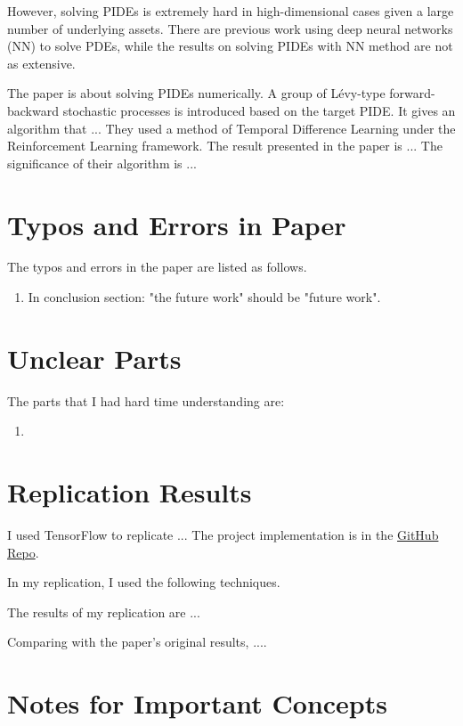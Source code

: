 \documentclass[12pt,letterpaper,oneside]{article}
\begin{document}
	However, solving PIDEs is extremely hard in high-dimensional cases given a large number of underlying assets. There are previous work using deep neural networks (NN) to solve PDEs, while the results on solving PIDEs with NN method are not as extensive.
	
	The paper is about solving PIDEs numerically. A group of L\'evy-type forward-backward stochastic processes is introduced based on the target PIDE. It gives an algorithm that ... They used a method of Temporal Difference Learning under the Reinforcement Learning framework.  The result presented in the paper is ... The significance of their algorithm is ...

	
\section{Typos and Errors in Paper}
	The typos and errors in the paper are listed as follows.
	\begin{enumerate}
		\item In conclusion section: "the future work" should be "future work".
	\end{enumerate}


\section{Unclear Parts}
	The parts that I had hard time understanding are:
	
	\begin{enumerate}
		\item 
	\end{enumerate}

\section{Replication Results}
	I used TensorFlow to replicate ... The project implementation is in the \href{https://github.com/GN-Yu/TSRL-project}{GitHub Repo}.
	
	In my replication, I used the following techniques.
	
	The results of my replication are ... 
	
	Comparing with the paper's original results, ....
	
	
	
\section{Notes for Important Concepts}
\end{document}
